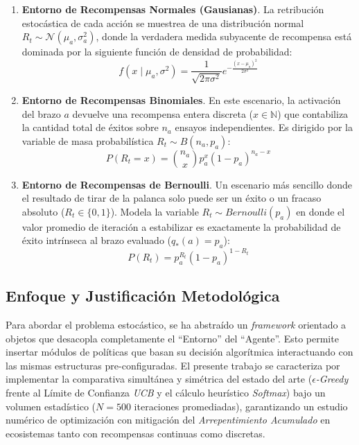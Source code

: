 \begin{enumerate}
\def\labelenumi{\arabic{enumi}.}
\item
  \textbf{Entorno de Recompensas Normales (Gausianas)}. La retribución
  estocástica de cada acción se muestrea de una distribución normal
  \(R_t \sim \mathcal{N}(\mu_a, \sigma_a^2)\), donde la verdadera medida
  subyacente de recompensa está dominada por la siguiente función de densidad de
  probabilidad:
  \[ f(x \mid \mu_a, \sigma^2) = \frac{1}{\sqrt{2\pi\sigma^2}} e^{-\frac{(x - \mu_a)^2}{2\sigma^2}} \]
\item
  \textbf{Entorno de Recompensas Binomiales}. En este escenario, la
  activación del brazo \(a\) devuelve una recompensa entera discreta
  (\(x \in \mathbb{N}\)) que contabiliza la cantidad total de éxitos
  sobre \(n_a\) ensayos independientes. Es dirigido por la variable de
  masa probabilística \(R_t \sim B(n_a, p_a)\):
  \[ P(R_t=x) = \binom{n_a}{x} p_a^x (1 - p_a)^{n_a - x} \]
\item
  \textbf{Entorno de Recompensas de Bernoulli}. Un escenario más sencillo
  donde el resultado de tirar de la palanca solo puede ser un éxito o un
  fracaso absoluto (\(R_t \in \{0, 1\}\)). Modela la variable
  \(R_t \sim Bernoulli(p_a)\) en donde el valor promedio de iteración a
  estabilizar es exactamente la probabilidad de éxito intrínseca al brazo
  evaluado (\(q_*(a) = p_a\)):
  \[ P(R_t) = p_a^{R_t} (1 - p_a)^{1 - R_t} \]
\end{enumerate}

\subsection{Enfoque y Justificación
Metodológica}\label{enfoque-y-justificaciuxf3n-metodoluxf3gica}

Para abordar el problema estocástico, se ha abstraído un
\emph{framework} orientado a objetos que desacopla completamente el
``Entorno'' del ``Agente''. Esto permite insertar módulos de políticas
que basan su decisión algorítmica interactuando con las mismas
estructuras pre-configuradas. El presente trabajo se caracteriza
por implementar la comparativa simultánea y simétrica del estado del
arte (\emph{\(\epsilon\)-Greedy} frente al Límite de Confianza
\emph{UCB} y el cálculo heurístico \emph{Softmax}) bajo un volumen
estadístico (\(N=500\) iteraciones promediadas), garantizando un estudio
numérico de optimización con mitigación del \emph{Arrepentimiento
Acumulado} en ecosistemas tanto con recompensas continuas como discretas.

